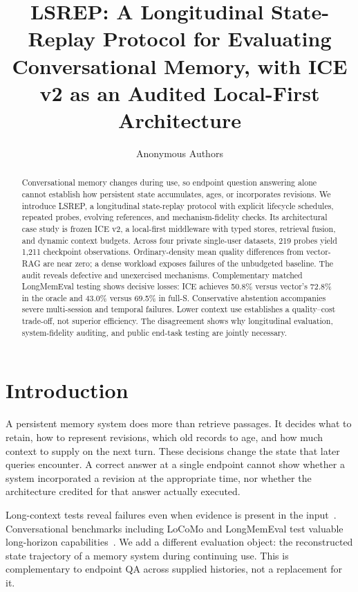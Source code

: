 \documentclass[11pt]{article}
\title{LSREP: A Longitudinal State-Replay Protocol for Evaluating Conversational Memory, with ICE v2 as an Audited Local-First Architecture}
\author{Anonymous Authors}
\begin{document}
\maketitle
\begin{abstract}
Conversational memory changes during use, so endpoint question answering alone cannot establish how persistent state accumulates, ages, or incorporates revisions. We introduce LSREP, a longitudinal state-replay protocol with explicit lifecycle schedules, repeated probes, evolving references, and mechanism-fidelity checks. Its architectural case study is frozen ICE v2, a local-first middleware with typed stores, retrieval fusion, and dynamic context budgets. Across four private single-user datasets, 219 probes yield 1,211 checkpoint observations. Ordinary-density mean quality differences from vector-RAG are near zero; a dense workload exposes failures of the unbudgeted baseline. The audit reveals defective and unexercised mechanisms. Complementary matched LongMemEval testing shows decisive losses: ICE achieves 50.8\% versus vector's 72.8\% in the oracle and 43.0\% versus 69.5\% in full-S. Conservative abstention accompanies severe multi-session and temporal failures. Lower context use establishes a quality--cost trade-off, not superior efficiency. The disagreement shows why longitudinal evaluation, system-fidelity auditing, and public end-task testing are jointly necessary.
\end{abstract}

\section{Introduction}
A persistent memory system does more than retrieve passages. It decides what to retain, how to represent revisions, which old records to age, and how much context to supply on the next turn. These decisions change the state that later queries encounter. A correct answer at a single endpoint cannot show whether a system incorporated a revision at the appropriate time, nor whether the architecture credited for that answer actually executed.

Long-context tests reveal failures even when evidence is present in the input~\citep{liu2024lost,hsieh2024ruler}. Conversational benchmarks including LoCoMo and LongMemEval test valuable long-horizon capabilities~\citep{maharana2024locomo,wu2025longmemeval}. We add a different evaluation object: the reconstructed state trajectory of a memory system during continuing use. This is complementary to endpoint QA across supplied histories, not a replacement for it.
\end{document}
